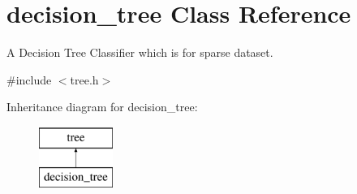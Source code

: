 \hypertarget{classdecision__tree}{\section{decision\+\_\+tree Class Reference}
\label{classdecision__tree}
}


A Decision Tree Classifier which is for sparse dataset.  




{\ttfamily \#include $<$tree.\+h$>$}

Inheritance diagram for decision\+\_\+tree\+:\begin{figure}[H]
\begin{center}
\leavevmode
\includegraphics[height=2.000000cm]{classdecision__tree}
\end{center}
\end{figure}
